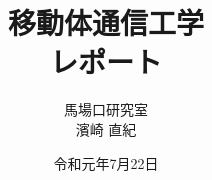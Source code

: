 \documentclass[a4paper]{jsarticle}
\title{\Huge 移動体通信工学\\\huge レポート\vspace{120mm}}
\author{\normalsize 馬場口研究室\vspace{5mm}\\\Large 濱崎 直紀\vspace{30mm}}
\date{令和元年7月22日}
\begin{document}
\begin{titlepage}
\maketitle
\thispagestyle{empty}
\end{titlepage}


\clearpage

\clearpage

\end{document}
